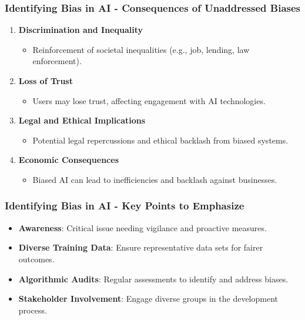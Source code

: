\documentclass{beamer}
\begin{document}
\begin{frame}[fragile]
    \frametitle{Identifying Bias in AI - Consequences of Unaddressed Biases}
    \begin{enumerate}
        \item \textbf{Discrimination and Inequality}
            \begin{itemize}
                \item Reinforcement of societal inequalities (e.g., job, lending, law enforcement).
            \end{itemize}
        \item \textbf{Loss of Trust}
            \begin{itemize}
                \item Users may lose trust, affecting engagement with AI technologies.
            \end{itemize}
        \item \textbf{Legal and Ethical Implications}
            \begin{itemize}
                \item Potential legal repercussions and ethical backlash from biased systems.
            \end{itemize}
        \item \textbf{Economic Consequences}
            \begin{itemize}
                \item Biased AI can lead to inefficiencies and backlash against businesses.
            \end{itemize}
    \end{enumerate}
\end{frame}

\begin{frame}[fragile]
    \frametitle{Identifying Bias in AI - Key Points to Emphasize}
    \begin{itemize}
        \item \textbf{Awareness}: Critical issue needing vigilance and proactive measures.
        \item \textbf{Diverse Training Data}: Ensure representative data sets for fairer outcomes.
        \item \textbf{Algorithmic Audits}: Regular assessments to identify and address biases.
        \item \textbf{Stakeholder Involvement}: Engage diverse groups in the development process.
    \end{itemize}
\end{frame}
\end{document}
